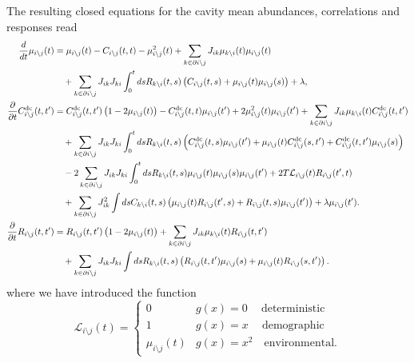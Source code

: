 \documentclass[
    preprint,
    linenumbers,
    amsmath,amssymb,amsfonts,
    aps, physrev,
    superscriptaddress,
    10pt,
    bibnotes
    ]{revtex4-2}
\begin{document}
The resulting closed equations for the cavity mean abundances, correlations and responses read
\begin{align}
  \frac{d}{dt}\mu_{i\setminus j}(t) & = \mu_{i\setminus j}(t)-C_{i\setminus j}(t,t)-\mu_{i\setminus j}^2(t)+\sum_{k\in\partial i \setminus j}J_{ik}\mu_{k\setminus i}(t)\mu_{i\setminus j}(t)  \nonumber \\
  & \quad +\sum_{k\in \partial i \setminus j}J_{ik}J_{ki}\int_{0}^{t}ds R_{k\setminus i}(t, s)\left(C_{i\setminus j}(t, s)+\mu_{i\setminus j}(t)\mu_{i\setminus j}(s)\right) + \lambda,\\
  \frac{\partial}{\partial t}C^{\rm dc}_{i\setminus j}(t,t') & = C^{\rm dc}_{i\setminus j}(t,t')\left(1-2\mu_{i\setminus j}(t)\right) - C^{\rm dc}_{i\setminus j}(t,t)\mu_{i\setminus j}(t') + 2 \mu_{i\setminus j}^2(t)\mu_{i\setminus j}(t') + \sum_{k\in\partial i \setminus j}J_{ik}\mu_{k\setminus i}(t)C^{\rm dc}_{i\setminus j}(t,t') \nonumber\\
  & \quad + \sum_{k\in \partial i \setminus j}J_{ik}J_{ki}\int_0^t ds R_{k\setminus i}(t,s)\left(C^{\rm dc}_{i\setminus j}(t,s)\mu_{i\setminus j}(t') + \mu_{i\setminus j}(t)C^{\rm dc}_{i\setminus j}(s,t') + C^{\rm dc}_{i\setminus j}(t,t')\mu_{i\setminus j}(s)\right) \nonumber \\
  & \quad - 2\sum_{k\in \partial i \setminus j}J_{ik}J_{ki}\int_0^t ds R_{k\setminus i}(t,s)\mu_{i\setminus j}(t)\mu_{i\setminus j}(s)\mu_{i\setminus j}(t') + 2T \mathcal{L}_{i\setminus j}(t)R_{i\setminus j}(t',t) \nonumber \\
  & \quad + \sum_{k\in \partial i \setminus j} J_{ik}^2 \int ds C_{k\setminus i}(t,s) \left(\mu_{i\setminus j}(t) R_{i\setminus j}(t',s) + R_{i\setminus j}(t,s) \mu_{i\setminus j}(t') \right) + \lambda \mu_{i\setminus j}( t').\\
  \frac{\partial}{\partial t}R_{i\setminus j}(t,t') & = R_{i\setminus j}(t,t') \left(1 - 2\mu_{i\setminus j}(t)\right) + \sum_{k\in\partial i \setminus j}J_{ik}\mu_{k\setminus i}(t)R_{i\setminus j}(t,t') \nonumber\\
  & \quad + \sum_{k\in \partial i \setminus j} J_{ik}J_{ki} \int ds R_{k\setminus i}(t,s) \left(R_{i\setminus j}(t,t')\mu_{i\setminus j}(s)+\mu_{i\setminus j}(t) R_{i\setminus j}(s,t') \right).
\end{align}
where we have introduced the function
\begin{equation}
  \mathcal{L}_{i\setminus j}(t) = \begin{cases}
    0 & g(x) = 0 \quad \ \text{deterministic}\\
    1 & g(x) = x \quad \ \text{demographic}\\
    \mu_{i\setminus j}(t) & g(x) = x^2 \quad \text{environmental}.
  \end{cases}
\end{equation}
\end{document}
